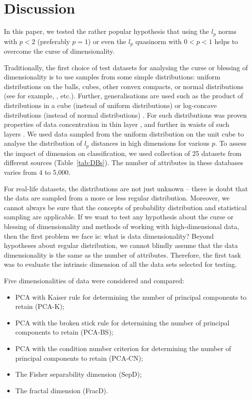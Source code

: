 \documentclass[entropy,article,submit,moreauthors,pdftex]{Definitions/mdpi}
\begin{document}
\section{Discussion}

In this paper, we tested the rather popular hypothesis that using the $l_p$ norms with $p<2$ (preferably $p=1$) or even the $l_p$ quasinorm with $0<p<1$ helps to overcome the curse of dimensionality.

Traditionally, the first choice of test datasets for analysing the curse or blessing of dimensionality is to use samples from some simple distributions: uniform distributions on the balls, cubes, other convex compacts, or normal distributions (see for example, \cite{korn2001,
beyer1999, hinneburg2000, aggarwal2001, aggarwal2001outlier, radovanovic2010, gorban2016}, etc.). Further, generalisations are used such as the product of distributions in a cube (instead of uniform distributions) or log-concave distributions (instead of normal distributions) \cite{Talagrand1995,GuedonMilman2011,gorban2018correction}. For such distributions was proven properties of data concentration in thin layer \cite{Talagrand1995}, and further in waists of such layers \cite{rayon2003isoperimetry}.
We used data sampled from the uniform distribution on the unit cube to analyse the distribution of $l_p$ distances in high dimensions for various $p$.
To assess the impact of dimension on classification, we used collection of 25 datasets from different sources (Table~\ref{tab:DBs}). The number of attributes in these databases varies from 4 to 5,000.

For real-life datasets, the distributions are not just unknown -- there is doubt that the data are sampled from a more or less regular distribution. Moreover, we cannot always be sure that the concepts of probability distribution and statistical sampling are applicable. If we want to test any hypothesis about the curse or blessing of dimensionality and methods of working with high-dimensional data, then the first problem we face is: what is data dimensionality? Beyond hypotheses about regular distribution, we cannot blindly assume that the data dimensionality is the same as the number of attributes. Therefore, the first task was to evaluate the intrinsic dimension of all the data sets selected for testing.

Five dimensionalities of data were considered and compared:
\begin{itemize}
\item PCA with  Kaiser rule for determining the number of principal components to retain (PCA-K);
\item PCA with the broken stick rule for determining the number of principal components to retain (PCA-BS);
\item PCA with the condition number criterion for determining the number of principal components to retain (PCA-CN);
\item The Fisher separability dimension (SepD);
\item The fractal dimension (FracD).
\end{itemize}
\end{document}
